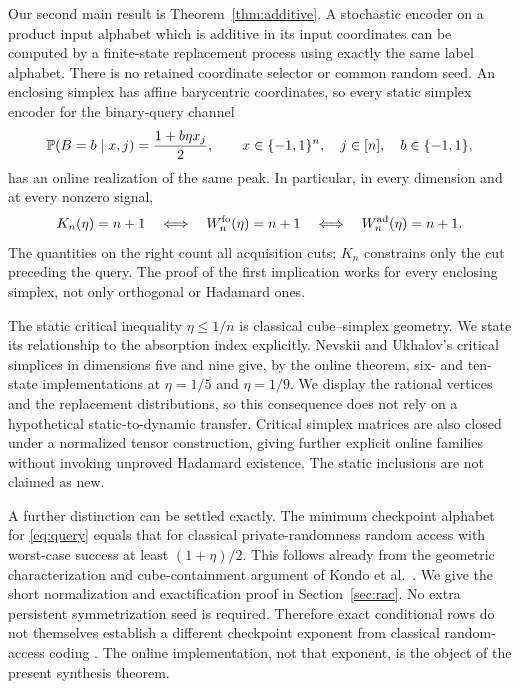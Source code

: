 Our second main result is Theorem~\ref{thm:additive}. A stochastic encoder
on a product input alphabet which is additive in its input coordinates
can be computed by a finite-state replacement process using exactly the
same label alphabet. There is no retained coordinate selector or common
random seed. An enclosing simplex has affine barycentric coordinates,
so every static simplex encoder for the binary-query channel
\begin{equation}\label{eq:query}
 \mathbb P(B=b\mid x,j)=\frac{1+b\eta x_j}{2},\qquad
 x\in\{-1,1\}^n,\quad j\in[n],\quad b\in\{-1,1\},
\end{equation}
has an online realization of the same peak. In particular, in every
dimension and at every nonzero signal,
\begin{equation}\label{eq:threshold-intro}
 K_n(\eta)=n+1\quad\Longleftrightarrow\quad
 W_n^{\rm fo}(\eta)=n+1
 \quad\Longleftrightarrow\quad W_n^{\rm ad}(\eta)=n+1.
\end{equation}
The quantities on the right count all acquisition cuts; $K_n$ constrains
only the cut preceding the query. The proof of the first implication
works for every enclosing simplex, not only orthogonal or Hadamard ones.

The static critical inequality $\eta\le1/n$ is classical cube--simplex
geometry. We state its relationship to the absorption index explicitly.
Nevskii and Ukhalov's critical simplices in dimensions five and nine
\cite{NU} give, by the online theorem, six- and ten-state implementations
at $\eta=1/5$ and $\eta=1/9$. We display the rational vertices and the
replacement distributions, so this consequence does not rely on a
hypothetical static-to-dynamic transfer. Critical simplex matrices are
also closed under a normalized tensor construction, giving further
explicit online families without invoking unproved Hadamard existence.
The static inclusions are not claimed as new.

A further distinction can be settled exactly. The minimum checkpoint
alphabet for \eqref{eq:query} equals that for classical private-randomness
random access with worst-case success at least $(1+\eta)/2$. This follows
already from the geometric characterization and cube-containment argument
of Kondo et al.\ \cite[Theorem 14, Lemma 15]{Kondo2026}. We give the short
normalization and exactification proof in Section~\ref{sec:rac}. No extra
persistent symmetrization seed is required. Therefore exact conditional
rows do not themselves establish a different checkpoint exponent from
classical random-access coding \cite{ANTV}. The online implementation,
not that exponent, is the object of the present synthesis theorem.

